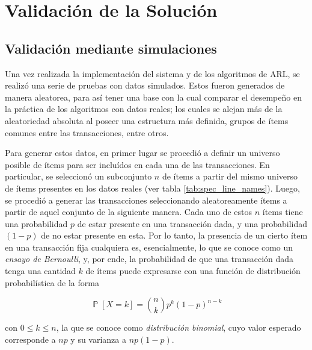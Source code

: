 \chapter{Validación de la Solución}


\section{Validación mediante simulaciones}

Una vez realizada la implementación del sistema y de los algoritmos de ARL, se realizó una serie de pruebas con datos simulados. Estos fueron generados de manera aleatorea, para así tener una base con la cual comparar el desempeño en la práctica de los algoritmos con datos reales; los cuales se alejan más de la aleatoriedad absoluta al poseer una estructura más definida, grupos de ítems comunes entre las transacciones, entre otros.

Para generar estos datos, en primer lugar se procedió a definir un universo posible de ítems para ser incluídos en cada una de las transacciones. En particular, se seleccionó un subconjunto $n$ de ítems a partir del mismo universo de ítems presentes en los datos reales (ver tabla \ref{tab:spec_line_names}). Luego, se procedió a generar las transacciones seleccionando aleatoreamente ítems a partir de aquel conjunto de la siguiente manera. Cada uno de estos $n$ ítems tiene una probabilidad $p$ de estar presente en una transacción dada, y una probabilidad $(1-p)$ de no estar presente en esta. Por lo tanto, la presencia de un cierto ítem en una transacción fija cualquiera es, esencialmente, lo que se conoce como un \textit{ensayo de Bernoulli}, y, por ende, la probabilidad de que una transacción dada tenga una cantidad $k$ de ítems puede expresarse con una función de distribución probabilística de la forma

\begin{equation*}
\operatorname{\mathbb{P}}[X = k] = \binom{n}{k}p^k(1-p)^{n-k}
\end{equation*}

con $0 \leq k \leq n$, la que se conoce como \textit{distribución binomial}, cuyo valor esperado corresponde a $np$ y su varianza a $np(1-p)$.

